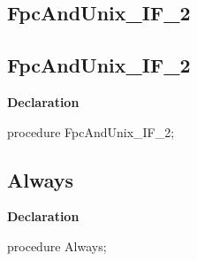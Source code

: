 \documentclass{report}
\newif\ifpdf
\begin{document}
\subsection*{\large{\textbf{FpcAndUnix{\_}IF{\_}2}}\normalsize\hspace{1ex}\hrulefill}
\else
\subsection*{FpcAndUnix{\_}IF{\_}2}
\fi
\label{ok_if_expressions-FpcAndUnix_IF_2}
\begin{list}{}{
\setlength{\itemindent}{0cm}
\setlength{\listparindent}{0cm}
\setlength{\leftmargin}{\evensidemargin}
\addtolength{\leftmargin}{\tmplength}
\settowidth{\labelsep}{X}
\addtolength{\leftmargin}{\labelsep}
\setlength{\labelwidth}{\tmplength}
}
\item[\textbf{Declaration}\hfill]
\ifpdf
\begin{flushleft}
\fi
\begin{ttfamily}
procedure FpcAndUnix{\_}IF{\_}2;\end{ttfamily}

\ifpdf
\end{flushleft}
\fi

\end{list}
\ifpdf
\subsection*{\large{\textbf{Always}}\normalsize\hspace{1ex}\hrulefill}
\else
\subsection*{Always}
\fi
\label{ok_if_expressions-Always}
\begin{list}{}{
\setlength{\itemindent}{0cm}
\setlength{\listparindent}{0cm}
\setlength{\leftmargin}{\evensidemargin}
\addtolength{\leftmargin}{\tmplength}
\settowidth{\labelsep}{X}
\addtolength{\leftmargin}{\labelsep}
\setlength{\labelwidth}{\tmplength}
}
\item[\textbf{Declaration}\hfill]
\ifpdf
\begin{flushleft}
\fi
\begin{ttfamily}
procedure Always;\end{ttfamily}

\ifpdf
\end{flushleft}
\fi

\end{list}
\end{document}

